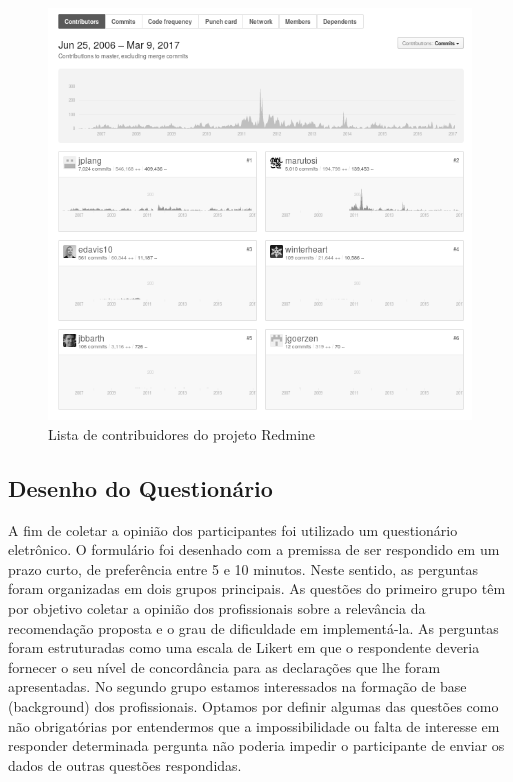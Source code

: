 \begin{figure}[htpb]
	\centering
	\includegraphics[width=0.8\linewidth]{./chapter-sugestoes-melhorias-fgrm/img/redmine_contribuidores.png}
	\caption{Lista de contribuidores do projeto Redmine}
\label{fig:redmine_contribuidores}
\end{figure}

\subsection{Desenho do Questionário}
\label{ssub:sug_melhoria_desenho_questionario}

A fim de coletar a opinião dos participantes foi utilizado um questionário
eletrônico. O formulário foi desenhado com a premissa de ser respondido em um
prazo curto, de preferência entre 5 e 10 minutos. Neste sentido, as perguntas
foram organizadas em dois grupos principais. As questões do primeiro grupo têm
por objetivo coletar a opinião dos profissionais sobre a relevância da
recomendação proposta e o grau de dificuldade em implementá-la. As perguntas
foram estruturadas como uma escala de Likert em que o respondente deveria
fornecer o seu nível de concordância para as declarações que lhe foram
apresentadas. No segundo grupo estamos interessados na formação de base
(background) dos profissionais. Optamos por definir algumas das questões como
não obrigatórias por entendermos que a impossibilidade ou falta de interesse em
responder determinada pergunta não poderia impedir o participante de enviar os
dados de outras questões respondidas.

